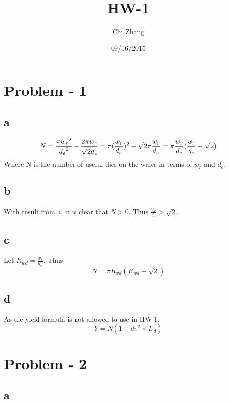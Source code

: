 \documentclass[a4paper,10pt]{article}
\title{HW-1}
\author{Chi Zhang}
\date{09/16/2015}
\begin{document}
\maketitle
\section*{Problem - 1}
\subsection*{a}
\begin{equation}
 N = \frac{\pi {w_r}^2}{{d_e}^2} - \frac{2\pi {w_r}}{\sqrt{2} d_e} = \pi(\frac{w_r}{d_e})^2 - \sqrt{2}\pi\frac{w_r}{d_e}\\
  = \pi\frac{w_r}{d_e} (\frac{w_r}{d_e} - \sqrt{2})
\end{equation}
Where N is the number of useful dies on the wafer in terms of \begin{math}w_r\end{math} and \begin{math}d_e\end{math}.
\subsection*{b}
With result from a, it is clear that \begin{math}N > 0\end{math}. Thus \begin{math}\frac{w_r}{d_e} > \sqrt{2}\end{math}.
\subsection*{c}
Let \begin{math}R_{wd} = \frac{w_r}{d_e}\end{math}. Thus
\begin{equation}
 N = \pi R_{wd} (R_{wd} - \sqrt{2})
\end{equation}
\subsection*{d}
As die yield formula is not allowed to use in HW-1.
\begin{equation}
 Y = N(1 - de^2 \times D_d)
\end{equation}
\section*{Problem - 2}
\subsection*{a}
\end{document}
